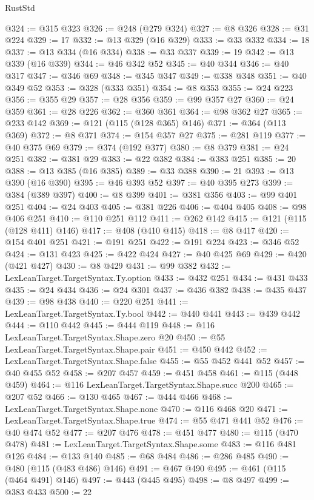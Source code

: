 \begin{lexlean}{RustStd}
\begin{coremodule}
{\begin{coremodule}
{{{{{{{{{{{{{{{{{{{{{{{{{{{{{{{{{{{{{{@324 := @315 @323
@326 := @248 (@279 @324)
@327 := @8 @326
@328 := @31 @224
@329 := 17
@332 := @13 @329 (@16 @329)
@333 := @33 @332
@334 := 18
@337 := @13 @334 (@16 @334)
@338 := @33 @337
@339 := 19
@342 := @13 @339 (@16 @339)
@344 := @46 @342 @52
@345 := @40 @344
@346 := @40 @317
@347 := @346 @69
@348 := @345 @347
@349 := @338 @348
@351 := @40 @349 @52
@353 := @328 (@333 @351)
@354 := @8 @353
@355 := @24 @223
@356 := @355 @29
@357 := @28 @356
@359 := @99 @357 @27
@360 := @24 @359
@361 := @28 @226
@362 := @360 @361
@364 := @98 @362 @27
@365 := @233 @142
@369 := @121 (@115 (@128 @365) @146)
@371 := @364 (@113 @369)
@372 := @8 @371
@374 := @154 @357 @27
@375 := @281 @119
@377 := @40 @375 @69
@379 := @374 (@192 @377)
@380 := @8 @379
@381 := @24 @251
@382 := @381 @29
@383 := @22 @382
@384 := @383 @251
@385 := 20
@388 := @13 @385 (@16 @385)
@389 := @33 @388
@390 := 21
@393 := @13 @390 (@16 @390)
@395 := @46 @393 @52
@397 := @40 @395 @273
@399 := @384 (@389 @397)
@400 := @8 @399
@401 := @381 @356
@403 := @99 @401 @251
@404 := @24 @403
@405 := @381 @226
@406 := @404 @405
@408 := @98 @406 @251
@410 := @110 @251 @112
@411 := @262 @142
@415 := @121 (@115 (@128 @411) @146)
@417 := @408 (@410 @415)
@418 := @8 @417
@420 := @154 @401 @251
@421 := @191 @251
@422 := @191 @224
@423 := @346 @52
@424 := @131 @423
@425 := @422 @424
@427 := @40 @425 @69
@429 := @420 (@421 @427)
@430 := @8 @429
@431 := @99 @382
@432 := LexLeanTarget.TargetSyntax.Ty.option
@433 := @432 @251
@434 := @431 @433
@435 := @24 @434
@436 := @24 @301
@437 := @436 @382
@438 := @435 @437
@439 := @98 @438
@440 := @220 @251
@441 := LexLeanTarget.TargetSyntax.Ty.bool
@442 := @440 @441
@443 := @439 @442
@444 := @110 @442
@445 := @444 @119
@448 := @116 LexLeanTarget.TargetSyntax.Shape.zero @20
@450 := @55 LexLeanTarget.TargetSyntax.Shape.pair
@451 := @450 @442
@452 := LexLeanTarget.TargetSyntax.Shape.false
@455 := @55 @452 @441 @52
@457 := @40 @455 @52
@458 := @207 @457
@459 := @451 @458
@461 := @115 (@448 @459)
@464 := @116 LexLeanTarget.TargetSyntax.Shape.succ @200
@465 := @207 @52
@466 := @130 @465
@467 := @444 @466
@468 := LexLeanTarget.TargetSyntax.Shape.none
@470 := @116 @468 @20
@471 := LexLeanTarget.TargetSyntax.Shape.true
@474 := @55 @471 @441 @52
@476 := @40 @474 @52
@477 := @207 @476
@478 := @451 @477
@480 := @115 (@470 @478)
@481 := LexLeanTarget.TargetSyntax.Shape.some
@483 := @116 @481 @126
@484 := @133 @140
@485 := @68 @484
@486 := @286 @485
@490 := @480 (@115 (@483 @486) @146)
@491 := @467 @490
@495 := @461 (@115 (@464 @491) @146)
@497 := @443 (@445 @495)
@498 := @8 @497
@499 := @383 @433
@500 := 22
}}}}}}}}}}}}}}}}}}}}}}}}}}}}}}}}}}}}}}
\end{coremodule}}
\end{coremodule}
\end{lexlean}
